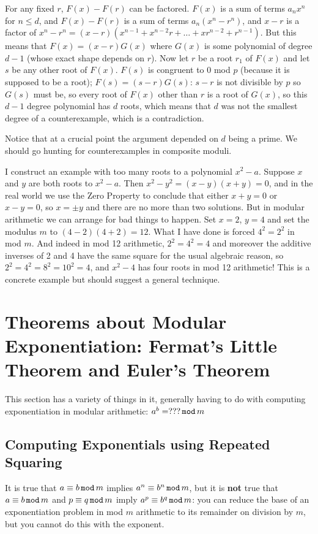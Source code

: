 \documentclass[12pt]{article}
\begin{document}
For any fixed $r$, $F(x)-F(r)$ can be factored.  $F(x)$ is a sum of terms $a_nx^n$ for $n \leq d$,
and $F(x)-F(r)$ is a sum of terms $a_n(x^n-r^n)$, and $x-r$ is a factor of $x^n-r^n = (x-r)(x^{n-1}+x^{n-2}r+\ldots+xr^{n-2}+ r^{n-1})$.  But this means that $F(x)=(x-r)G(x)$ where $G(x)$
is some polynomial of degree $d-1$ (whose exact shape depends on $r$).  Now let $r$ be a root $r_1$ of $F(x)$ and let $s$ be any other root of $F(x)$.  $F(s)$ is congruent to 0 mod $p$ (because it is supposed to be a root);
$F(s) = (s-r)G(s)$:  $s-r$ is not divisible by $p$ so $G(s)$ must be, so every root of $F(x)$ other than $r$
is a root of $G(x)$, so this $d-1$ degree polynomial has $d$ roots, which means that $d$ was not the smallest degree of a counterexample, which is a contradiction.

Notice that at a crucial point the argument depended on $d$ being a prime.   We should go hunting for counterexamples in composite moduli.

I construct an example with too many roots to a polynomial $x^2-a$.   Suppose $x$ and $y$ are both roots to
$x^2-a$.  Then $x^2-y^2=(x-y)(x+y)=0$, and in the real world we use the Zero Property to conclude that either
$x+y=0$ or $x-y=0$, so $x=\pm y$ and there are no more than two solutions.  But in modular arithmetic we can arrange for bad things to happen.   Set $x=2$, $y=4$ and set the modulus $m$ to $(4-2)(4+2)=12$.   What I have done is forced
$4^2=2^2$ in mod $m$.  And indeed in mod 12 arithmetic, $2^2=4^2=4$ and moreover the additive inverses of 2
and 4 have the same square for the usual algebraic reason, so $2^2=4^2=8^2=10^2=4$, and $x^2-4$ has four roots in mod 12 arithmetic!   This is a concrete example but should suggest a general technique.




\section{Theorems about Modular Exponentiation:  Fermat's Little Theorem and Euler's Theorem}

This section has a variety of things in it, generally having to do with computing exponentiation in modular arithmetic:   $a^b=???\,{\tt mod}\,m$

\subsection{Computing Exponentials using Repeated Squaring}

It is true that $a \equiv b\,{\tt mod}\,m$ implies $a^n\equiv b^n\,{\tt mod}\,m$, but it is {\bf not} true that $a\equiv b\,{\tt mod}\,m$ and $p \equiv q\,{\tt mod} \,m$ imply $a^p \equiv b^q\,{\tt mod}\,m$:  you can reduce the base
of an exponentiation problem in mod $m$ arithmetic to its remainder on division by $m$, but you cannot do this with the exponent.
\end{document}
